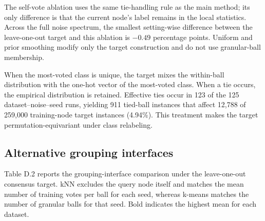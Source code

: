 \documentclass[10pt,letterpaper]{elsarticle}
\begin{document}
The self-vote ablation uses the same tie-handling rule as the main method; its only difference is that the current node's label remains in the local statistics. Across the full noise spectrum, the smallest setting-wise difference between the leave-one-out target and this ablation is \(- 0.49\) percentage points. Uniform and prior smoothing modify only the target construction and do not use granular-ball membership.

When the most-voted class is unique, the target mixes the within-ball distribution with the one-hot vector of the most-voted class. When a tie occurs, the empirical distribution is retained. Effective ties occur in 123 of the 125 dataset--noise--seed runs, yielding 911 tied-ball instances that affect 12,788 of 259,000 training-node target instances (4.94\%). This treatment makes the target permutation-equivariant under class relabeling.

\Needspace{352pt}

\subsection{Alternative grouping interfaces}\label{sec:D.2}

Table D.2 reports the grouping-interface comparison under the leave-one-out consensus target. kNN excludes the query node itself and matches the mean number of training votes per ball for each seed, whereas k-means matches the number of granular balls for that seed. Bold indicates the highest mean for each dataset.
\end{document}
